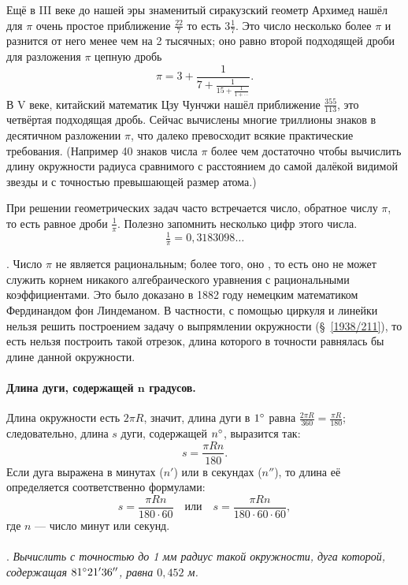 \documentclass[twoside]{book}
\begin{document}
Ещё в III веке до нашей эры знаменитый сиракузский геометр Архимед нашёл для $\pi$ очень простое приближение $\tfrac{22}7$ то есть $3\tfrac17$.
Это число несколько более $\pi$ и разнится от него менее чем на 2 тысячных;
оно равно второй подходящей дроби для разложения $\pi$ цепную дробь
\[\pi=3+\frac{1}{7+\frac{1}{15+\frac{1}{1+\cdots}}}.\]
В V веке, китайский математик Цзу Чунчжи нашёл приближение $\tfrac{355}{113}$, это четвёртая подходящая дробь. 
Сейчас вычислены многие триллионы знаков в десятичном разложении $\pi$, что далеко превосходит всякие практические требования.
(Например 40 знаков числа $\pi$ более чем достаточно чтобы вычислить длину окружности радиуса сравнимого с расстоянием до самой далёкой видимой звезды и с точностью превышающей размер атома.) 

При решении геометрических задач часто встречается число, обратное числу $\pi$, то есть равное дроби $\tfrac1\pi$.
Полезно запомнить несколько цифр этого числа.
\[\tfrac1\pi = 0{,}3183098\dots\]

\smallskip
{}.
Число $\pi$ не является рациональным;
более того, оно , то есть оно не может служить корнем никакого алгебраического уравнения с рациональными коэффициентами.
Это было доказано в 1882 году немецким математиком Фердинандом фон Линдеманом.
В частности, с помощью циркуля и линейки нельзя решить построением задачу о выпрямлении окружности (§~\ref{1938/211}), то есть нельзя построить такой отрезок, длина которого в точности равнялась бы длине данной окружности.


\paragraph{Длина дуги, содержащей $\bm{n}$ градусов.}\label{1938/239}
Длина окружности есть $2\pi R$, значит, длина дуги в $1\degree$ равна $\frac{2\pi R}{360}=\frac{\pi R}{180}$; следовательно, длина $s$ дуги, содержащей $n\degree$, выразится так:
\[s=\frac{\pi R n}{180}.\]
Если дуга выражена в минутах ($n'$) или в секундах ($n''$), то длина её определяется соответственно формулами:
\[s=\frac{\pi R n}{180\cdot 60}
\quad\text{или}\quad
s=\frac{\pi R n}{180\cdot 60\cdot 60},\]
где $n$ — число минут или секунд.

\paragraph{}\label{1938/240}
.
\emph{Вычислить с точностью до 1 мм радиус такой окружности, дуга которой, содержащая $81\degree 21'36''$, равна $0{,}452$ м.}
\end{document}
